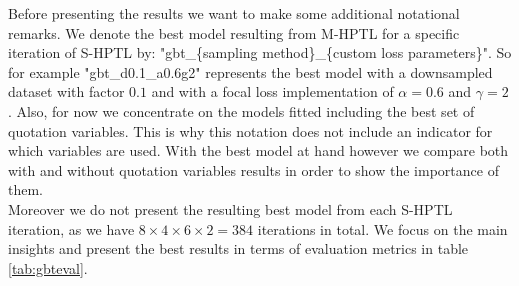 \documentclass[12pt,titlepage]{article}
\begin{document}
Before presenting the results we want to make some additional notational remarks. We denote the best model resulting from M-HPTL for a specific iteration of S-HPTL by: "gbt\_\{sampling method\}\_\{custom loss parameters\}". So for example "gbt\_d0.1\_a0.6g2" represents the best model with a downsampled dataset with factor $0.1$ and with a focal loss implementation of $\alpha=0.6$ and $\gamma=2$. Also, for now we concentrate on the models fitted including the best set of quotation variables. This is why this notation does not include an indicator for which variables are used. With the best model at hand however we compare both with and without quotation variables results in order to show the importance of them. \\
Moreover we do not present the resulting best model from each S-HPTL iteration, as we have $8\times4\times6\times2=384$ iterations in total. We focus on the main insights and present the best results in terms of evaluation metrics in table \ref{tab:gbteval}. \\
\setlength{\tabcolsep}{3pt}
\renewcommand{\arraystretch}{1.5}
\end{document}
